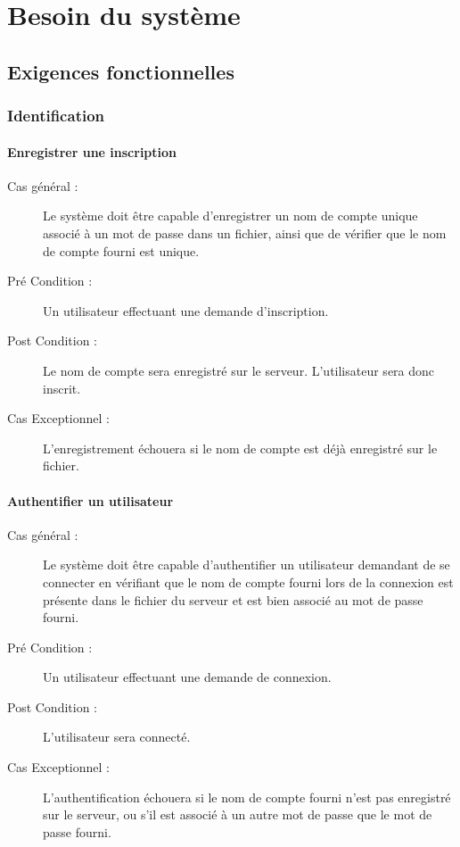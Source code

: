 \documentclass[a4paper]{report}
\begin{document}

\chapter{Besoin du système}
\section{Exigences fonctionnelles}

\subsection{Identification}
\subsubsection{Enregistrer une inscription}
\begin{description}
    \item[Cas général :] Le système doit être capable d'enregistrer un nom de compte unique associé à un mot de passe dans un fichier, ainsi que de vérifier que le nom de compte fourni est unique.
    \item[Pré Condition  :] Un \gls{utilisateur} effectuant une demande d'inscription.
    \item[Post Condition :] Le nom de compte sera enregistré sur le \gls{serveur}. L'\gls{utilisateur} sera donc inscrit.
    \item[Cas Exceptionnel :] L'enregistrement échouera si le nom de compte est déjà enregistré sur le fichier.
\end{description}

\subsubsection{Authentifier un utilisateur}
\begin{description}
    \item[Cas général :] Le système doit être capable d'authentifier un \gls{utilisateur} demandant de se connecter en vérifiant que le nom de compte fourni lors de la connexion est présente dans le fichier du \gls{serveur} et est bien associé au mot de passe fourni.
    \item[Pré Condition  :] Un \gls{utilisateur} effectuant une demande de connexion.
    \item[Post Condition :] L'\gls{utilisateur} sera connecté.
    \item[Cas Exceptionnel :] L'authentification échouera si le nom de compte fourni n'est pas enregistré sur le \gls{serveur}, ou s'il est associé à un autre mot de passe que le mot de passe fourni.
\end{description}
\end{document}
